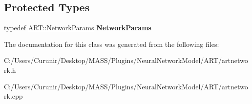 \subsection*{Protected Types}
\begin{DoxyCompactItemize}
\item 
\mbox{\label{class_a_r_t_network_a71deee5d6ab1571d49a259123c75dd12}} 
typedef \hyperlink{struct_a_r_t_1_1_network_params}{A\+R\+T\+::\+Network\+Params} {\bfseries Network\+Params}
\end{DoxyCompactItemize}


The documentation for this class was generated from the following files\+:\begin{DoxyCompactItemize}
\item 
C\+:/\+Users/\+Curunir/\+Desktop/\+M\+A\+S\+S/\+Plugins/\+Neural\+Network\+Model/\+A\+R\+T/artnetwork.\+h\item 
C\+:/\+Users/\+Curunir/\+Desktop/\+M\+A\+S\+S/\+Plugins/\+Neural\+Network\+Model/\+A\+R\+T/artnetwork.\+cpp\end{DoxyCompactItemize}
